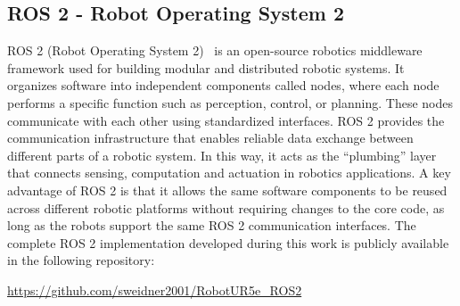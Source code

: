 \subsection{ROS 2 - Robot Operating System 2}
ROS 2 (Robot Operating System 2)~\cite{ROS2Documentation} is an open-source robotics middleware framework used for building modular and distributed robotic systems. It organizes software into independent components called nodes, where each node performs a specific function such as perception, control, or planning. These nodes communicate with each other using standardized interfaces.
ROS 2 provides the communication infrastructure that enables reliable data exchange between different parts of a robotic system. In this way, it acts as the “plumbing” layer that connects sensing, computation and actuation in robotics applications. A key advantage of ROS 2 is that it allows the same software components to be reused across different robotic platforms without requiring changes to the core code, as long as the robots support the same ROS 2 communication interfaces.
The complete ROS 2 implementation developed during this work is publicly available in the following repository:
\begin{center}
    \url{https://github.com/sweidner2001/RobotUR5e_ROS2}
\end{center}

